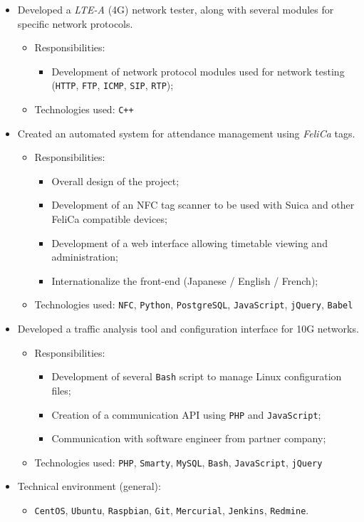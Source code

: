 \documentclass[11pt,a4paper,sans]{moderncv}        %
\begin{document}
{\begin{itemize}
\begin{itemize}
\end{itemize}
\item Developed a \emph{LTE-A} (4G) network tester, along with several modules for specific network protocols.
  \begin{itemize}%
  \item Responsibilities:
    \begin{itemize}%
      \item Development of network protocol modules used for network testing (\texttt{HTTP}, \texttt{FTP}, \texttt{ICMP}, \texttt{SIP}, \texttt{RTP});
    \end{itemize}
  \item Technologies used: \texttt{C++}
  \end{itemize}
\item Created an automated system for attendance management using \emph{FeliCa} tags.
\begin{itemize}%
  \item Responsibilities:
    \begin{itemize}%
      \item Overall design of the project;
      \item Development of an NFC tag scanner to be used with Suica and other FeliCa compatible devices;
      \item Development of a web interface allowing timetable viewing and administration;
      \item Internationalize the front-end (Japanese / English / French);
    \end{itemize}
  \item Technologies used: \texttt{NFC}, \texttt{Python}, \texttt{PostgreSQL}, \texttt{JavaScript}, \texttt{jQuery}, \texttt{Babel}
\end{itemize}
\item Developed a traffic analysis tool and configuration interface for 10G networks.
\begin{itemize}%
  \item Responsibilities:
    \begin{itemize}%
      \item Development of several \texttt{Bash} script to manage Linux configuration files;
      \item Creation of a communication API using \texttt{PHP} and \texttt{JavaScript};
      \item Communication with software engineer from partner company;
    \end{itemize}
  \item Technologies used: \texttt{PHP}, \texttt{Smarty}, \texttt{MySQL}, \texttt{Bash}, \texttt{JavaScript}, \texttt{jQuery}
\end{itemize}
\item Technical environment (general):
\begin{itemize}%
\item \texttt{CentOS}, \texttt{Ubuntu}, \texttt{Raspbian}, \texttt{Git}, \texttt{Mercurial}, \texttt{Jenkins}, \texttt{Redmine}.
\end{itemize}
\end{itemize}
}
\end{document}
